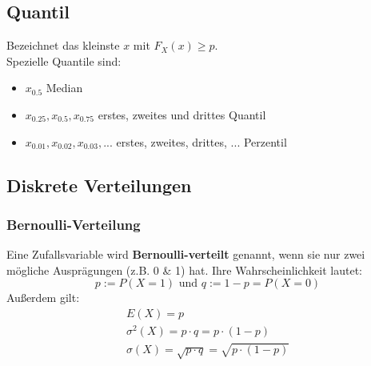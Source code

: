 \documentclass[12pt]{article}
\begin{document}
\subsection{Quantil}
Bezeichnet das kleinste $x$ mit $F_X(x)\geq p$. \\
Spezielle Quantile sind:
\begin{itemize}
	\item $x_{0.5}$ Median
	\item $x_{0.25}, x_{0.5}, x_{0.75}$ erstes, zweites und drittes Quantil
	\item $x_{0.01}, x_{0.02}, x_{0.03}, ...$ erstes, zweites, drittes, ... Perzentil
\end{itemize}
\subsection{Diskrete Verteilungen}
\subsubsection{Bernoulli-Verteilung}
Eine Zufallsvariable wird \textbf{Bernoulli-verteilt} genannt, wenn sie nur zwei mögliche Ausprägungen (z.B. 0 \& 1) hat.  Ihre Wahrscheinlichkeit lautet:
\begin{equation*}
	p:=P(X=1) \text{ und } q:=1-p=P(X=0)
\end{equation*}
Außerdem gilt:
\begin{gather*}
	E(X)=p\\
	\sigma^2(X)=p\cdot q=p\cdot (1-p)\\
	\sigma(X)=\sqrt{p\cdot q}=\sqrt{p\cdot (1-p)}
\end{gather*}
\end{document}
